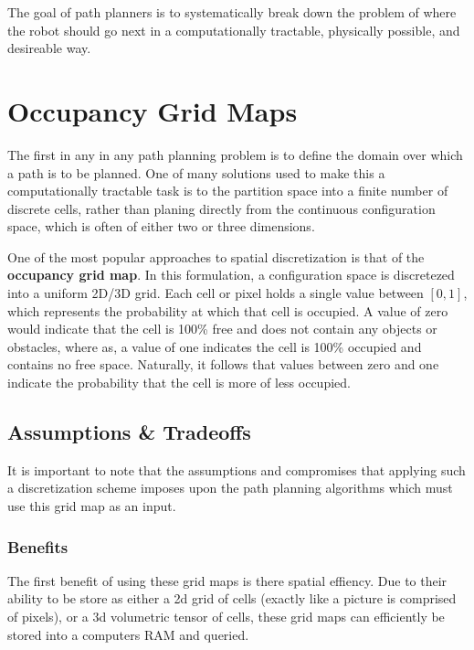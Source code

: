 \documentclass[journal]{IEEEtran}
\begin{document}
The goal of path planners is to systematically break down the problem of where the robot should go next in a computationally tractable, physically possible, and desireable way. 




\section{Occupancy Grid Maps}

The first in any in any path planning problem is to define the domain over which a path is to be planned. One of many solutions used to make this a computationally tractable task is to the partition space into a finite number of discrete cells, rather than planing directly from the continuous configuration space, which is often of either two or three dimensions. 

One of the most popular approaches to spatial discretization is that of the \textbf{occupancy grid map}. In this formulation, a configuration space is discretezed into a uniform 2D/3D grid. Each cell or pixel holds a single value between $\left [ 0, 1 \right ]$, which represents the probability at which that cell is occupied. A value of zero would indicate that the cell is 100\% free and does not contain any objects or obstacles, where as, a value of one indicates the cell is 100\% occupied and contains no free space. Naturally, it follows that values between zero and one indicate the probability that the cell is more of less occupied. \\


\subsection{Assumptions \& Tradeoffs}

It is important to note that the assumptions and compromises that applying such a discretization scheme imposes upon the path planning algorithms which must use this grid map as an input. 

\subsubsection{Benefits}

The first benefit of using these grid maps is there spatial effiency. Due to their ability to be store as either a 2d grid of cells (exactly like a picture is comprised of pixels), or a 3d volumetric tensor of cells, these grid maps can efficiently be stored into a computers RAM and queried. \\
\end{document}
